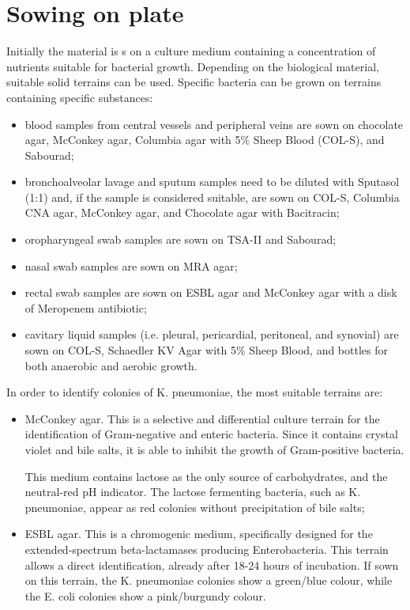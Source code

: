 \documentclass[11pt]{report}
\begin{document}
\section{Sowing on plate}
Initially the material is s on a culture medium containing a concentration of nutrients suitable for bacterial growth.
Depending on the biological material, suitable solid terrains can be used. 
Specific bacteria can be grown on terrains containing specific substances:
\begin{itemize}
\item blood samples from central vessels and peripheral veins are sown on chocolate agar, McConkey agar, Columbia agar with 5$\%$ Sheep Blood (COL-S), and Sabourad;
\item bronchoalveolar lavage and sputum samples need to be diluted with Sputasol (1:1) and, if the sample is considered suitable, are sown on COL-S, Columbia CNA agar, McConkey agar, and Chocolate agar with Bacitracin;
\item oropharyngeal swab samples are sown on TSA-II and Sabourad;
\item nasal swab samples are sown on MRA agar;
\item rectal swab samples are sown on ESBL agar and McConkey agar with a disk of Meropenem antibiotic;
\item cavitary liquid samples (i.e. pleural, pericardial, peritoneal, and synovial) are sown on COL-S, Schaedler KV Agar with 5$\%$ Sheep Blood, and bottles for both anaerobic and aerobic growth.
\end{itemize}

In order to identify colonies of K. pneumoniae, the most suitable terrains are:
\begin{itemize}
\item McConkey agar.
This is a selective and differential culture terrain for the identification of Gram-negative and enteric bacteria.
Since it contains crystal violet and bile salts, it is able to inhibit the growth of Gram-positive bacteria. 

This medium contains lactose as the only source of carbohydrates, and the neutral-red pH indicator.
The lactose fermenting bacteria, such as K. pneumoniae, appear as red colonies without precipitation of bile salts;
\item ESBL agar.
This is a chromogenic medium, specifically designed for the extended-spectrum beta-lactamases producing Enterobacteria. This terrain allows a direct identification, already after 18-24 hours of incubation.
If sown on this terrain, the K. pneumoniae colonies show a green/blue colour, while the E. coli colonies show a pink/burgundy colour.
\end{itemize}
\end{document}
